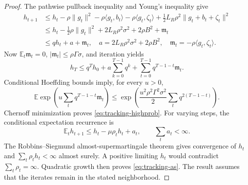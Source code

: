 \begin{proof}
The pathwise pullback inequality and Young's inequality give
\begin{align}
 h_{t+1}
 &\le h_t-\rho\|g_t\|^2-\rho\langle g_t,b_t\rangle
       -\rho\langle g_t,\zeta_t\rangle
       +\tfrac12L_R\rho^2\|g_t+b_t+\zeta_t\|^2\\
 &\le h_t-\tfrac12\rho\|g_t\|^2
       +2L_R\rho^2\sigma^2+2\rho B^2+\mathfrak m_t\\
 &\le qh_t+a+\mathfrak m_t,
 \quad a=2L_R\rho^2\sigma^2+2\rho B^2,
 \quad\mathfrak m_t=-\rho\langle g_t,\zeta_t\rangle.
\end{align}
Now $\mathbb E_t\mathfrak m_t=0$, $|\mathfrak m_t|\le\rho\Gamma\sigma$,
and iteration yields
\begin{equation}
 h_T\le q^Th_0+a\sum_{k=0}^{T-1}q^k+
             \sum_{t=0}^{T-1}q^{T-1-t}\mathfrak m_t.
\end{equation}
Conditional Hoeffding bounds imply, for every $u>0$,
\begin{equation}
 \mathbb E\exp\left(u\sum_tq^{T-1-t}\mathfrak m_t\right)
 \le\exp\left(\frac{u^2\rho^2\Gamma^2\sigma^2}{2}
                        \sum_tq^{2(T-1-t)}\right).
\end{equation}
Chernoff minimization proves \eqref{eq:tracking-highprob}.
For varying steps, the conditional expectation recurrence is
\begin{equation}
 \mathbb E_t h_{t+1}\le h_t-\mu\rho_t h_t+a_t,\qquad
 \sum_ta_t<\infty.
\end{equation}
The Robbins--Siegmund almost-supermartingale theorem
\cite{robbins1971convergence} gives convergence of
$h_t$ and $\sum_t\rho_t h_t<\infty$ almost surely. A positive limiting
$h_t$ would contradict $\sum_t\rho_t=\infty$. Quadratic growth then
proves \eqref{eq:tracking-as}. The result assumes that the iterates remain
in the stated neighborhood.
\end{proof}
